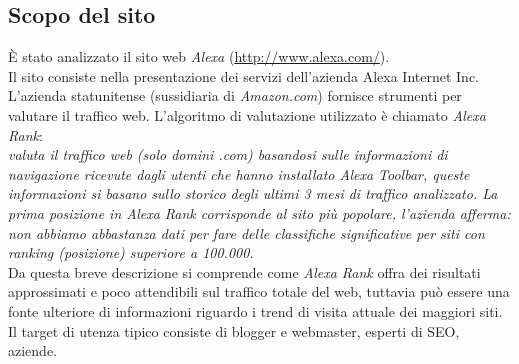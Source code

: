 \subsection{Scopo del sito}\label{scopo}
È stato analizzato il sito web \textit{Alexa} (\url{http://www.alexa.com/}). \\
Il sito consiste nella presentazione dei servizi dell'azienda Alexa Internet Inc. \\
L'azienda statunitense (sussidiaria di \textit{Amazon.com}) fornisce 
strumenti per valutare il traffico web. L'algoritmo di valutazione utilizzato è chiamato \textit{Alexa Rank}: \\
\textit{valuta il traffico web (solo domini .com) basandosi sulle informazioni di navigazione ricevute dagli utenti che 
hanno installato Alexa Toolbar, queste informazioni si basano sullo 
storico degli ultimi 3 mesi di traffico analizzato.
La prima posizione in Alexa Rank corrisponde al sito più popolare, 
l'azienda afferma: non abbiamo abbastanza dati per fare delle classifiche 
significative per siti con ranking (posizione) superiore a 100.000.} \\
Da questa breve descrizione si comprende come \textit{Alexa Rank} offra dei risultati approssimati e poco attendibili sul traffico totale del web, tuttavia può 
essere una fonte ulteriore di informazioni riguardo i trend di visita attuale dei maggiori siti.\\ 
Il target di utenza tipico consiste di blogger e webmaster, esperti di SEO, 
aziende.
